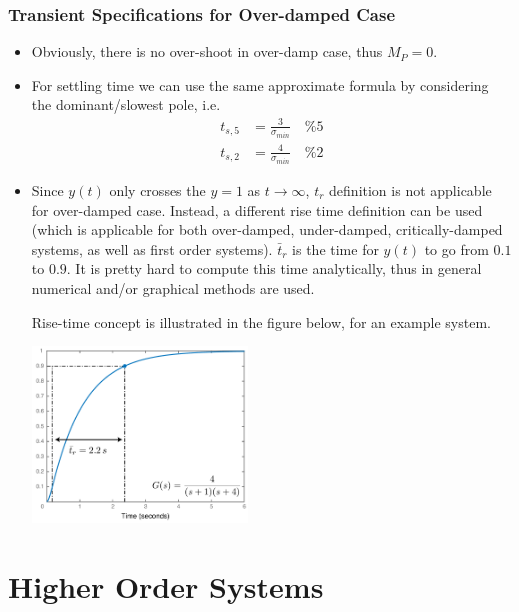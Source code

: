 \documentclass[twoside]{article}
\begin{document}
  \subsubsection*{Transient Specifications for Over-damped Case}

\begin{itemize}  
  \item Obviously, there is no over-shoot in over-damp case, thus $M_P = 0$.   
  \item For settling time we can use the same approximate formula by considering the dominant/slowest
  pole, i.e.
  \begin{align*}
  t_{s,5} &=\frac{3}{\sigma_{min}} \quad \%5 
	\\ 
  t_{s,2} &=\frac{4}{\sigma_{min}} \quad \%2
  \end{align*}
  \item Since $y(t)$ only crosses the $y = 1$ as $t \to \infty$, $t_r$ definition is not applicable for 
  over-damped case. Instead, a different rise time definition can be used (which is applicable for both
  over-damped, under-damped, critically-damped systems, as well as first order systems). $\bar{t}_r$
  is the time for $y(t)$ to go from $0.1$ to $0.9$. It is pretty hard to compute this time analytically, thus in
  general numerical and/or graphical methods are used. 
  
  Rise-time concept is illustrated in the figure below, for an example system.
  \vspace{6pt}
  
         \begin{minipage}[h]{1\linewidth}
    \begin{center}
     \includegraphics[width=0.45\textwidth]{rise2}
    \end{center}
  \end{minipage}
  
\end{itemize}

\section{Higher Order Systems}
\end{document}
